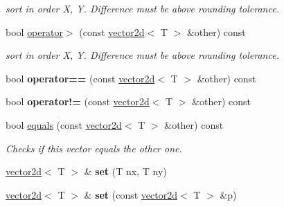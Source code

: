 \begin{DoxyCompactItemize}
\begin{DoxyCompactList}\small\item\em sort in order X, Y. Difference must be above rounding tolerance. \end{DoxyCompactList}\item 
bool \hyperlink{classirr_1_1core_1_1vector2d_a8cd8cc1a497e428e0318a5f698c8396b}{operator$>$} (const \hyperlink{classirr_1_1core_1_1vector2d}{vector2d}$<$ T $>$ \&other) const \hypertarget{classirr_1_1core_1_1vector2d_a8cd8cc1a497e428e0318a5f698c8396b}{}\label{classirr_1_1core_1_1vector2d_a8cd8cc1a497e428e0318a5f698c8396b}

\begin{DoxyCompactList}\small\item\em sort in order X, Y. Difference must be above rounding tolerance. \end{DoxyCompactList}\item 
bool {\bfseries operator==} (const \hyperlink{classirr_1_1core_1_1vector2d}{vector2d}$<$ T $>$ \&other) const \hypertarget{classirr_1_1core_1_1vector2d_a39d74f53f61d65876dc884be7ebe4420}{}\label{classirr_1_1core_1_1vector2d_a39d74f53f61d65876dc884be7ebe4420}

\item 
bool {\bfseries operator!=} (const \hyperlink{classirr_1_1core_1_1vector2d}{vector2d}$<$ T $>$ \&other) const \hypertarget{classirr_1_1core_1_1vector2d_a9270c2d9b665790235d17ecb94450554}{}\label{classirr_1_1core_1_1vector2d_a9270c2d9b665790235d17ecb94450554}

\item 
bool \hyperlink{classirr_1_1core_1_1vector2d_adca6dbf0b73bbed483471137b8b13bd8}{equals} (const \hyperlink{classirr_1_1core_1_1vector2d}{vector2d}$<$ T $>$ \&other) const 
\begin{DoxyCompactList}\small\item\em Checks if this vector equals the other one. \end{DoxyCompactList}\item 
\hyperlink{classirr_1_1core_1_1vector2d}{vector2d}$<$ T $>$ \& {\bfseries set} (T nx, T ny)\hypertarget{classirr_1_1core_1_1vector2d_ab689d358d5ffb2ebf547d4597d6dbb9d}{}\label{classirr_1_1core_1_1vector2d_ab689d358d5ffb2ebf547d4597d6dbb9d}

\item 
\hyperlink{classirr_1_1core_1_1vector2d}{vector2d}$<$ T $>$ \& {\bfseries set} (const \hyperlink{classirr_1_1core_1_1vector2d}{vector2d}$<$ T $>$ \&p)\hypertarget{classirr_1_1core_1_1vector2d_ada63a008c05eabc08b4974edc409e001}{}\label{classirr_1_1core_1_1vector2d_ada63a008c05eabc08b4974edc409e001}


\end{DoxyCompactItemize}
